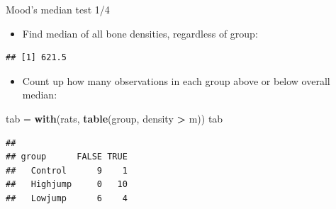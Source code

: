 \documentclass[
  ignorenonframetext,
]{beamer}
\newenvironment{Shaded}{\begin{snugshade}}{\end{snugshade}}
\newcommand{\DataTypeTok}[1]{\textcolor[rgb]{0.13,0.29,0.53}{#1}}
\newcommand{\KeywordTok}[1]{\textcolor[rgb]{0.13,0.29,0.53}{\textbf{#1}}}
\newcommand{\NormalTok}[1]{#1}
\newcommand{\OperatorTok}[1]{\textcolor[rgb]{0.81,0.36,0.00}{\textbf{#1}}}
\newcommand{\StringTok}[1]{\textcolor[rgb]{0.31,0.60,0.02}{#1}}
\providecommand{\tightlist}{%
  \setlength{\itemsep}{0pt}\setlength{\parskip}{0pt}}
\begin{document}
\begin{frame}[fragile]{Mood's median test 1/4}
\protect\hypertarget{moods-median-test-14}{}

\begin{itemize}
\tightlist
\item
  Find median of all bone densities, regardless of group:
\end{itemize}

\small

\begin{Shaded}
\end{Shaded}

\begin{verbatim}
## [1] 621.5
\end{verbatim}

\normalsize

\begin{itemize}
\tightlist
\item
  Count up how many observations in each group above or below overall
  median:
\end{itemize}

\begin{Shaded}
\begin{Highlighting}[]
\NormalTok{tab =}\StringTok{ }\KeywordTok{with}\NormalTok{(rats, }\KeywordTok{table}\NormalTok{(group, density }\OperatorTok{>}\StringTok{ }\NormalTok{m))}
\NormalTok{tab}
\end{Highlighting}
\end{Shaded}

\begin{verbatim}
##           
## group      FALSE TRUE
##   Control      9    1
##   Highjump     0   10
##   Lowjump      6    4
\end{verbatim}

\end{frame}
\end{document}

